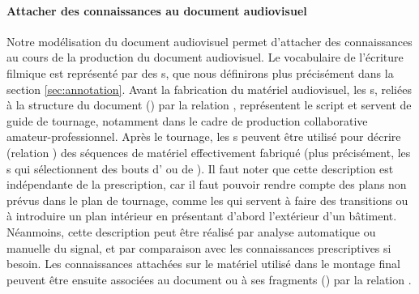 \paragraph{Attacher des connaissances au document audiovisuel}
Notre modélisation du document audiovisuel permet d'attacher des connaissances au cours de la production du document audiovisuel.
Le vocabulaire de l'écriture filmique est représenté par des s, que nous définirons plus précisément dans la section \ref{sec:annotation}. 
Avant la fabrication du matériel audiovisuel, les s, reliées à la structure du document () par la relation , représentent le script et servent de guide de tournage, notamment dans le cadre de production collaborative amateur-professionnel.
Après le tournage, les s peuvent être utilisé pour décrire (relation ) des séquences de matériel effectivement fabriqué (plus précisément, les s qui sélectionnent des bouts d' ou de ).
Il faut noter que cette description est indépendante de la prescription, car il faut pouvoir rendre compte des plans non prévus dans le plan de tournage, comme les  qui servent à faire des transitions ou à introduire un plan intérieur en présentant d'abord l'extérieur d'un bâtiment.
Néanmoins, cette description peut être réalisé par analyse automatique ou manuelle du signal, et par comparaison avec les connaissances prescriptives si besoin.
Les connaissances attachées sur le matériel utilisé dans le montage final peuvent être ensuite associées au document ou à ses fragments () par la relation .



 
